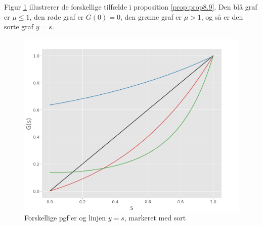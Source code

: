 Figur \ref{fig:proofprop8.9} illustrerer de forskellige tilfælde i proposition \ref{prop:prop8.9}. Den blå graf er $\mu\leq1$, den røde graf er $G(0)=0$, den grønne graf er $\mu>1$, og så er den sorte graf $y=s$. 
\begin{figure}[H]
    \centering
   \includegraphics[scale=0.5]{fig/img/Markus.png}
    \caption{Forskellige pgf'er og linjen $y = s$, markeret med sort}
    \label{fig:proofprop8.9}
\end{figure}

